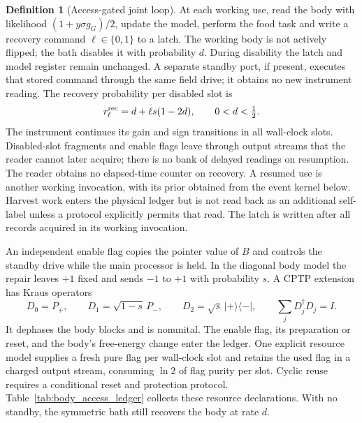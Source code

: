 \documentclass[12pt]{article}
\theoremstyle{definition}
\newtheorem{definition}[theorem]{Definition}
\begin{document}
\begin{definition}[Access-gated joint loop]
\label{def:access_joint}
At each working use, read the body with likelihood $(1+y\sigma g_G)/2$, update the model, perform the food task and write a recovery command $\ell\in\{0,1\}$ to a latch. The working body is not actively flipped; the bath disables it with probability $d$. During disability the latch and model register remain unchanged. A separate standby port, if present, executes that stored command through the same field drive; it obtains no new instrument reading. The recovery probability per disabled slot is
\[
 r^{\rm rec}_\ell=d+\ell s(1-2d),\qquad 0<d<\tfrac12.
\]
The instrument continues its gain and sign transitions in all wall-clock slots. Disabled-slot fragments and enable flags leave through output streams that the reader cannot later acquire; there is no bank of delayed readings on resumption. The reader obtains no elapsed-time counter on recovery. A resumed use is another working invocation, with its prior obtained from the event kernel below.
Harvest work enters the physical ledger but is not read back as an additional self-label unless a protocol explicitly permits that read. The latch is written after all records acquired in its working invocation.
\end{definition}

An independent enable flag copies the pointer value of $B$ and controls the standby drive while the main processor is held. In the diagonal body model the repair leaves $+1$ fixed and sends $-1$ to $+1$ with probability $s$. A CPTP extension has Kraus operators
\[
 D_0=P_+,\qquad D_1=\sqrt{1-s}\,P_-,\qquad
 D_2=\sqrt{s}\,\lvert+\rangle\langle-\rvert,
 \qquad \sum_jD_j^\dagger D_j=I.
\]
It dephases the body blocks and is nonunital. The enable flag, its preparation or reset, and the body's free-energy change enter the ledger. One explicit resource model supplies a fresh pure flag per wall-clock slot and retains the used flag in a charged output stream, consuming $\ln2$ of flag purity per slot. Cyclic reuse requires a conditional reset and protection protocol. Table~\ref{tab:body_access_ledger} collects these resource declarations. With no standby, the symmetric bath still recovers the body at rate $d$.
\end{document}
